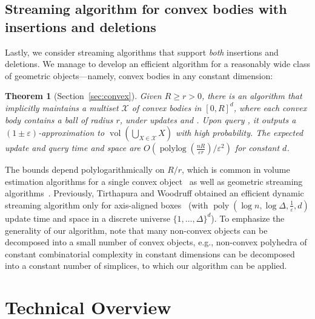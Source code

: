 \documentclass[11pt]{article}
\def\poly{\operatorname{poly}}
\def\polylog{\operatorname{polylog}}
\def\vol{\operatorname{vol}}		%
\newtheorem{theorem}{Theorem}[section]
\newcommand{\eps}{\varepsilon}
\newcommand{\class}[1]{\mathcal{#1}}
\begin{document}
\subsection{Streaming algorithm for convex bodies with insertions and deletions}
Lastly, we consider streaming algorithms that support \emph{both} insertions and deletions.
We manage to develop an efficient algorithm for a reasonably wide class of geometric objects---namely, convex bodies in any constant dimension:
%
\begin{theorem}[Section~\ref{sec:convex}]
\label{thm:convexalgo}
Given $R \ge r > 0$, there is an algorithm that implicitly maintains a multiset $\class{X}$ of convex bodies in $[0,R]^d$, where each convex body contains a ball of radius $r$, under updates  and . Upon query \est{}, it outputs a $(1\pm\eps)$-approximation to $\vol\left(\bigcup_{X \in \class{X}} X\right)$ with high probability. The expected update and query time and space are $O(\polylog(\frac{nR}{\eps r}) / \eps^2)$ for constant $d$.
\end{theorem}
%
The bounds depend polylogarithmically on $R/r$, which is common in volume estimation algorithms for a single convex object~\cite{DyerFK91} as well as geometric streaming algorithms~\cite{Indyk04,FrahlingIS08}.
%
Previously, Tirthapura and Woodruff obtained an efficient dynamic streaming algorithm only for axis-aligned boxes~\cite{TW12} (with $\poly(\log n, \log \Delta, \frac{1}{\eps}, d)$ update time and space in a discrete universe $\{1,\ldots,\Delta\}^d$).
To emphasize the generality of our algorithm, note that many non-convex objects can be decomposed into a small number of convex objects, e.g., non-convex polyhedra of constant combinatorial complexity in constant dimensions can be decomposed into a constant number of simplices, to which our algorithm can be  applied.
%
\section{Technical Overview}
%
\end{document}
